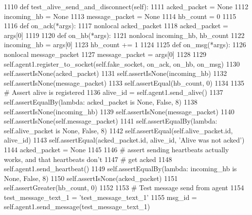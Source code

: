 \begin{DoxyCode}
1110     \textcolor{keyword}{def }test\_alive\_send\_and\_disconnect(self):
1111         acked\_packet = \textcolor{keywordtype}{None}
1112         incoming\_hb = \textcolor{keywordtype}{None}
1113         message\_packet = \textcolor{keywordtype}{None}
1114         hb\_count = 0
1115 
1116         \textcolor{keyword}{def }on\_ack(*args):
1117             nonlocal acked\_packet
1118             acked\_packet = args[0]
1119 
1120         \textcolor{keyword}{def }on\_hb(*args):
1121             nonlocal incoming\_hb, hb\_count
1122             incoming\_hb = args[0]
1123             hb\_count += 1
1124 
1125         \textcolor{keyword}{def }on\_msg(*args):
1126             nonlocal message\_packet
1127             message\_packet = args[0]
1128 
1129         self.agent1.register\_to\_socket(self.fake\_socket, on\_ack, on\_hb, on\_msg)
1130         self.assertIsNone(acked\_packet)
1131         self.assertIsNone(incoming\_hb)
1132         self.assertIsNone(message\_packet)
1133         self.assertEqual(hb\_count, 0)
1134 
1135         \textcolor{comment}{# Assert alive is registered}
1136         alive\_id = self.agent1.send\_alive()
1137         self.assertEqualBy(\textcolor{keyword}{lambda}: acked\_packet \textcolor{keywordflow}{is} \textcolor{keywordtype}{None}, \textcolor{keyword}{False}, 8)
1138         self.assertIsNone(incoming\_hb)
1139         self.assertIsNone(message\_packet)
1140         self.assertIsNone(self.message\_packet)
1141         self.assertEqualBy(\textcolor{keyword}{lambda}: self.alive\_packet \textcolor{keywordflow}{is} \textcolor{keywordtype}{None}, \textcolor{keyword}{False}, 8)
1142         self.assertEqual(self.alive\_packet.id, alive\_id)
1143         self.assertEqual(acked\_packet.id, alive\_id, \textcolor{stringliteral}{'Alive was not acked'})
1144         acked\_packet = \textcolor{keywordtype}{None}
1145 
1146         \textcolor{comment}{# assert sending heartbeats actually works, and that heartbeats don't}
1147         \textcolor{comment}{# get acked}
1148         self.agent1.send\_heartbeat()
1149         self.assertEqualBy(\textcolor{keyword}{lambda}: incoming\_hb \textcolor{keywordflow}{is} \textcolor{keywordtype}{None}, \textcolor{keyword}{False}, 8)
1150         self.assertIsNone(acked\_packet)
1151         self.assertGreater(hb\_count, 0)
1152 
1153         \textcolor{comment}{# Test message send from agent}
1154         test\_message\_text\_1 = \textcolor{stringliteral}{'test\_message\_text\_1'}
1155         msg\_id = self.agent1.send\_message(test\_message\_text\_1)

\end{DoxyCode}
